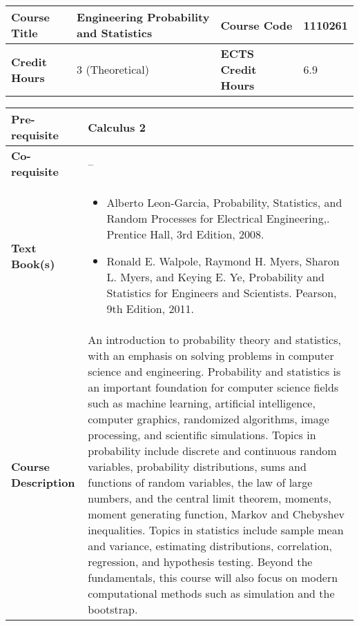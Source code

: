 \documentclass[12pt]{article}
\begin{document}
\begin{minipage}{\textwidth}
\begin{tabularx}{\textwidth}{|l|X|l|X|}
\hline
\textbf{Course Title}       &    Engineering Probability and Statistics & \textbf{Course Code}       & 1110261  \\ \hline
\textbf{Credit Hours}       &  3 (Theoretical) & \textbf{ECTS Credit Hours}       &  6.9 \\ \hline
\end{tabularx}

\begin{tabularx}{\textwidth}{|l|X|}
\hline
\textbf{Pre-requisite}      &  Calculus 2 \\ \hline
\textbf{Co-requisite}       &  -- \\ \hline
\textbf{Text Book(s)}      & \begin{minipage}{.70\textwidth}
					\begin{itemize} \itemsep-0.4em
						\vspace{3mm}
						\item Alberto Leon-Garcia, Probability, Statistics, and Random Processes for Electrical Engineering,. Prentice Hall, 3rd Edition, 2008.
						\item Ronald E. Walpole, Raymond H. Myers, Sharon L. Myers, and Keying E. Ye, Probability and Statistics for Engineers and Scientists. Pearson, 9th Edition, 2011.
						\vspace{3mm}
					\end{itemize}
				\end{minipage}  \\ \hline
\textbf{Course Description} & \begin{minipage}{.70\textwidth}
					\vspace{3mm}
					An introduction to probability theory and statistics, with an emphasis on solving problems in computer science and engineering. Probability and statistics is an important foundation for computer science fields such as machine learning, artificial intelligence, computer graphics, randomized algorithms, image processing, and scientific simulations. Topics in probability include discrete and continuous random variables, probability distributions, sums and functions of random variables, the law of large numbers, and the central limit theorem, moments, moment generating function, Markov and Chebyshev inequalities. Topics in statistics include sample mean and variance, estimating distributions, correlation, regression, and hypothesis testing. Beyond the fundamentals, this course will also focus on modern computational methods such as simulation and the bootstrap.

					\vspace{3mm}
					\end{minipage} \\ \hline
\end{tabularx}
\end{minipage}
\end{document}
